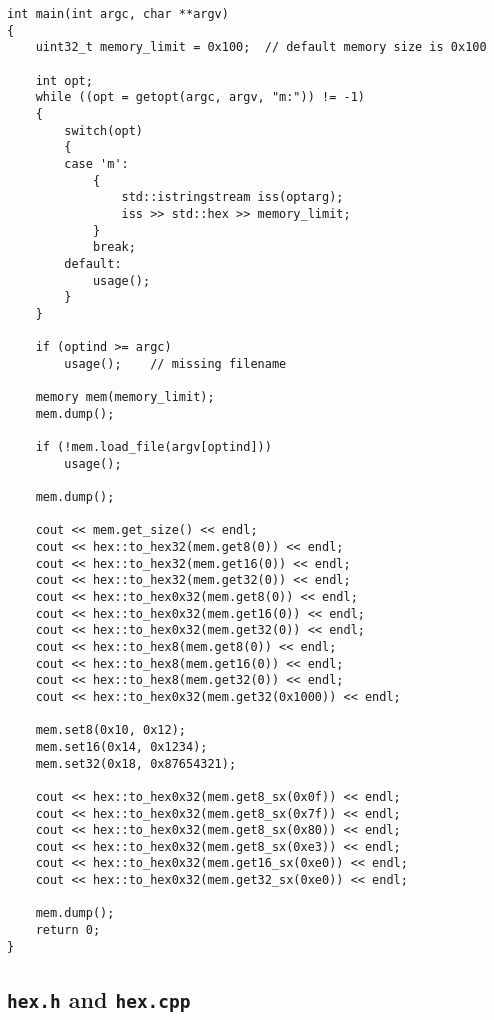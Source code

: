 \documentclass[11pt]{article}
\begin{document}
\begin{lstlisting}[frame=single, title={main() Function}]
int main(int argc, char **argv)
{
    uint32_t memory_limit = 0x100;  // default memory size is 0x100

    int opt;
    while ((opt = getopt(argc, argv, "m:")) != -1)
    {
        switch(opt)
        {
        case 'm':
            {
                std::istringstream iss(optarg);
                iss >> std::hex >> memory_limit;
            }
            break;
        default:
            usage();
        }
    }

    if (optind >= argc)
        usage();    // missing filename

    memory mem(memory_limit);
    mem.dump();

    if (!mem.load_file(argv[optind]))
        usage();

    mem.dump();

    cout << mem.get_size() << endl;
    cout << hex::to_hex32(mem.get8(0)) << endl;
    cout << hex::to_hex32(mem.get16(0)) << endl;
    cout << hex::to_hex32(mem.get32(0)) << endl;
    cout << hex::to_hex0x32(mem.get8(0)) << endl;
    cout << hex::to_hex0x32(mem.get16(0)) << endl;
    cout << hex::to_hex0x32(mem.get32(0)) << endl;
    cout << hex::to_hex8(mem.get8(0)) << endl;
    cout << hex::to_hex8(mem.get16(0)) << endl;
    cout << hex::to_hex8(mem.get32(0)) << endl;
    cout << hex::to_hex0x32(mem.get32(0x1000)) << endl;

    mem.set8(0x10, 0x12);
    mem.set16(0x14, 0x1234);
    mem.set32(0x18, 0x87654321);

    cout << hex::to_hex0x32(mem.get8_sx(0x0f)) << endl;
    cout << hex::to_hex0x32(mem.get8_sx(0x7f)) << endl;
    cout << hex::to_hex0x32(mem.get8_sx(0x80)) << endl;
    cout << hex::to_hex0x32(mem.get8_sx(0xe3)) << endl;
    cout << hex::to_hex0x32(mem.get16_sx(0xe0)) << endl;
    cout << hex::to_hex0x32(mem.get32_sx(0xe0)) << endl;

    mem.dump();
    return 0;
}
\end{lstlisting}


\subsection{{\tt hex.h} and {\tt hex.cpp}}
\end{document}
